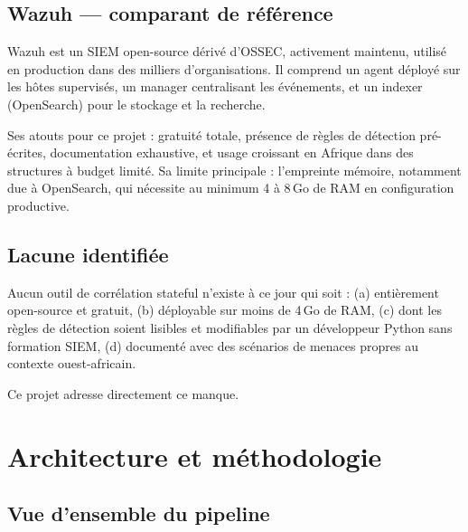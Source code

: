 \documentclass[11pt,a4paper]{article}
\begin{document}
\subsection{Wazuh — comparant de référence}

Wazuh est un SIEM open-source dérivé d'OSSEC, activement maintenu,
utilisé en production dans des milliers d'organisations.
Il comprend un agent déployé sur les hôtes supervisés, un manager
centralisant les événements, et un indexer (OpenSearch) pour le stockage
et la recherche.

Ses atouts pour ce projet : gratuité totale, présence de règles de détection
pré-écrites, documentation exhaustive, et usage croissant en Afrique
dans des structures à budget limité.
Sa limite principale : l'empreinte mémoire, notamment due à OpenSearch,
qui nécessite au minimum 4 à 8\,Go de RAM en configuration productive.

\subsection{Lacune identifiée}

Aucun outil de corrélation stateful n'existe à ce jour qui soit :
(a) entièrement open-source et gratuit,
(b) déployable sur moins de 4\,Go de RAM,
(c) dont les règles de détection soient lisibles et modifiables
    par un développeur Python sans formation SIEM,
(d) documenté avec des scénarios de menaces propres au contexte ouest-africain.

Ce projet adresse directement ce manque.

\section{Architecture et méthodologie}

\subsection{Vue d'ensemble du pipeline}
\end{document}

